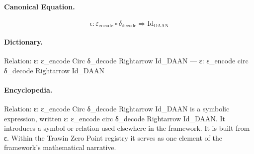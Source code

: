 \paragraph{Canonical Equation.}
\[
\epsilon: \varepsilon_{\text{encode}} \circ \delta_{\text{decode}} \Rightarrow \text{Id}_{\text{DAAN}}
\]

\paragraph{Dictionary.}
Relation: ε: ε\_encode Circ δ\_decode Rightarrow Id\_DAAN — ε: ε\_encode circ δ\_decode Rightarrow Id\_DAAN

\paragraph{Encyclopedia.}
Relation: ε: ε\_encode Circ δ\_decode Rightarrow Id\_DAAN is a symbolic expression, written ε: ε\_encode circ δ\_decode Rightarrow Id\_DAAN. It introduces a symbol or relation used elsewhere in the framework. It is built from ε. Within the Trawin Zero Point registry it serves as one element of the framework's mathematical narrative.
